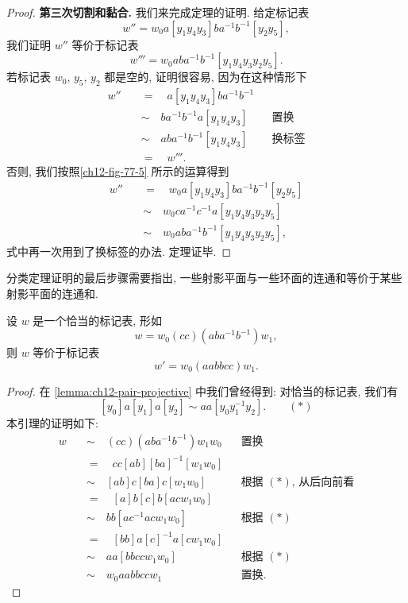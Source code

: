 \begin{proof}
\textbf{第三次切割和黏合.} 我们来完成定理的证明. 给定标记表
\[
w''=w_{0}a[y_{1}y_{4}y_{3}]ba^{-1}b^{-1}[y_{2}y_{5}],
\]
我们证明 $w''$ 等价于标记表
\[
w'''=w_{0}aba^{-1}b^{-1}[y_{1}y_{4}y_{3}y_{2}y_{5}].
\]
若标记表 $w_{0}$, $y_{5}$, $y_{2}$ 都是空的, 证明很容易, 因为在这种情形下
\begin{align*}
w''\quad&=\quad a[y_{1}y_{4}y_{3}]ba^{-1}b^{-1}\\
&\sim\quad ba^{-1}b^{-1}a[y_{1}y_{4}y_{3}] &&\text{置换}\\
&\sim\quad aba^{-1}b^{-1}[y_{1}y_{4}y_{3}] &&\text{换标签}\\
&=\quad w'''.
\end{align*}
否则, 我们按照\cref{ch12-fig-77-5} 所示的运算得到
\begin{align*}
w''\quad&=\quad w_{0}a[y_{1}y_{4}y_{3}]ba^{-1}b^{-1}[y_{2}y_{5}]\\
&\sim\quad w_{0}ca^{-1}c^{-1}a[y_{1}y_{4}y_{3}y_{2}y_{5}]\\
&\sim\quad w_{0}aba^{-1}b^{-1}[y_{1}y_{4}y_{3}y_{2}y_{5}],
\end{align*}
式中再一次用到了换标签的办法. 定理证毕.

\end{proof}

分类定理证明的最后步骤需要指出, 一些射影平面与一些环面的连通和等价于某些射影平面的连通和.

\begin{lemma}[环面与射影平面的交换]
\label{lemma:ch12-torus-projective-swap}
设 $w$ 是一个恰当的标记表, 形如
\[
w=w_{0}(cc)(aba^{-1}b^{-1})w_{1},
\]
则 $w$ 等价于标记表
\[
w'=w_{0}(aabbcc)w_{1}.
\]
\end{lemma}

\begin{proof}
在 \cref{lemma:ch12-pair-projective} 中我们曾经得到: 对恰当的标记表, 我们有
\[
[y_{0}]a[y_{1}]a[y_{2}]\sim aa[y_{0}y_{1}^{-1}y_{2}]. \qquad (*)
\]
本引理的证明如下:
\begin{align*}
w\quad&\sim\quad (cc)(aba^{-1}b^{-1})w_{1}w_{0} &&\text{置换}\\
&=\quad cc[ab][ba]^{-1}[w_{1}w_{0}]\\
&\sim\quad [ab]c[ba]c[w_{1}w_{0}] &&\text{根据 $(*)$, 从后向前看}\\
&=\quad [a]b[c]b[acw_{1}w_{0}]\\
&\sim\quad bb[ac^{-1}acw_{1}w_{0}] &&\text{根据 $(*)$}\\
&=\quad [bb]a[c]^{-1}a[cw_{1}w_{0}]\\
&\sim\quad aa[bbccw_{1}w_{0}] &&\text{根据 $(*)$}\\
&\sim\quad w_{0}aabbccw_{1} &&\text{置换}.
\end{align*}
\end{proof}

